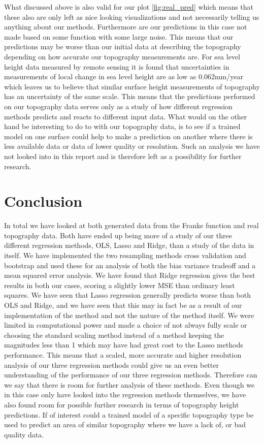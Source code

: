 \documentclass[12pt]{article}
\begin{document}
What discussed above is also valid for our plot \ref{fig:real_pred} which means that these also are only left as nice looking visualizations and not necessarily telling us anything about our methods. Furthermore are our predictions in this case not made based on some function with some large noise. This means that our predictions may be worse than our initial data at describing the topography depending on how accurate our topography measurements are. For sea level height data measured by remote sensing it is found that uncertainties in measurements of local change in sea level height are as low as 0.062mm/year \cite{sealevel} which leaves us to believe that similar surface height measurements of topography has an uncertainty of the same scale. This means that the predictions performed on our topography data serves only as a study of how different regression methods predicts and reacts to different input data. What would on the other hand be interesting to do to with our topography data, is to see if a trained model on one surface could help to make a prediction on another where there is less available data or data of lower quality or resolution. Such an analysis we have not looked into in this report and is therefore left as a possibility for further research.

\section{Conclusion}
In total we have looked at both generated data from the Franke function and real topography data. Both have ended up being more of a study of our three different regression methods, OLS, Lasso and Ridge, than a study of the data in itself. We have implemented the two resampling methods cross validation and bootstrap and used these for an analysis of both the bias variance tradeoff and a mean squared error analysis. We have found that Ridge regression gives the best results in both our cases, scoring a slightly lower MSE than ordinary least squares. We have seen that Lasso regression generally predicts worse than both OLS and Ridge, and we have seen that this may in fact be as a result of our implementation of the method and not the nature of the method itself. We were limited in computational power and made a choice of not always fully scale or choosing the standard scaling method instead of a method keeping the magnitudes less than 1 which may have had great cost to the Lasso methods performance. This means that a scaled, more accurate and higher resolution analysis of our three regression methods could give us an even better understanding of the performance of our three regression methods. Therefore can we say that there is room for further analysis of these methods. Even though we in this case only have looked into the regression methods themselves, we have also found room for possible further research in terms of topography height predictions. If of interest could a trained model of a specific topography type be used to predict an area of similar topography where we have a lack of, or bad quality data.
\newpage
\nocite{bishop}
\nocite{hastie}
\printbibliography
\end{document}
